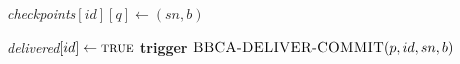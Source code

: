 \begin{algorithm}
\begin{algorithmic}[1]
		\State\textit{checkpoints}$[id][q]\gets (sn,b)$
	\EndIf
	\EndUponEvent	
	
		\State\textit{delivered}$[id]\gets\textsc{true}$
		\State\textbf{trigger} $\textsc{BBCA-DELIVER-COMMIT}(p, id, sn, b)$
	\EndUponExists
	
	\caption{\primitive implementation (continues).}	
  	\label{alg:bbca-pt2}
   \end{algorithmic}
\end{algorithm}  

